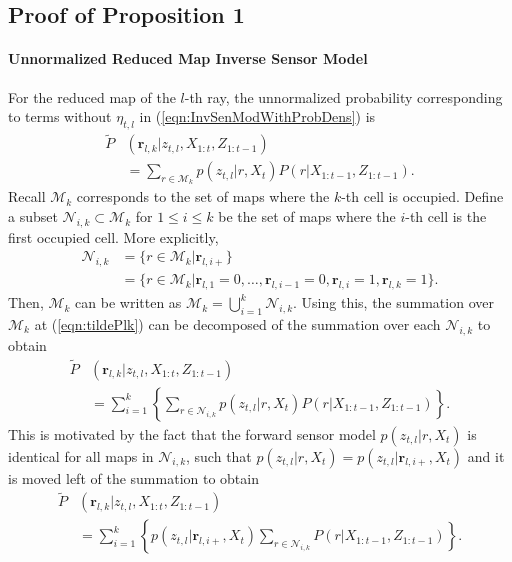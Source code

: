 \documentclass[letterpaper, 10pt, conference]{ieeeconf}
\newcommand{\braces}[1]{\ensuremath{\left\{ #1 \right\}}}
\newcommand{\refeqn}[1]{(\ref{eqn:#1})}
\begin{document}
\begin{appendix}
\label{append}


\subsection{Proof of Proposition 1}

\paragraph{Unnormalized Reduced Map Inverse Sensor Model}
For the reduced map of the $l$-th ray, the unnormalized probability corresponding to terms without $\eta_{t,l}$ in \refeqn{InvSenModWithProbDens} is %
\begin{align}
\tilde P&(\mathbf{r}_{l,k}|z_{t,l},X_{1:t},Z_{1:t-1})\nonumber\\
& = \sum_{r\in\mathcal{M}_{k}} p(z_{t,l}|r,X_t) P(r|X_{1:t-1},Z_{1:t-1}).\label{eqn:tildePlk}
\end{align}
Recall $\mathcal{M}_k$ corresponds to the set of maps where the $k$-th cell is occupied. Define a subset $\mathcal{N}_{i,k}\subset \mathcal{M}_k$ for $1\leq i\leq k$ be the set of maps where the $i$-th cell is the first occupied cell. More explicitly, 
\begin{align*}
\mathcal{N}_{i,k} & = \{ r\in\mathcal{M}_k| \mathbf{r}_{l,i+}\}\\
&= \{ r\in\mathcal{M}_k| \mathbf{r}_{l,1}=0,\ldots, \mathbf{r}_{l,i-1}=0, \mathbf{r}_{l,i}=1,
\mathbf{r}_{l,k}=1\}.
\end{align*}
Then, $\mathcal{M}_k$ can be written as $\mathcal{M}_k =\bigcup_{i=1}^{k} \mathcal{N}_{i,k}$. Using this, the summation over $\mathcal{M}_k$ at \refeqn{tildePlk} can be decomposed of the summation over each $\mathcal{N}_{i,k}$ to obtain
\begin{align*}
\tilde P&(\mathbf{r}_{l,k}|z_{t,l},X_{1:t},Z_{1:t-1})\nonumber\\
& = \sum_{i=1}^k\braces{\sum_{r\in\mathcal{N}_{i,k}} p(z_{t,l}|r,X_t) P(r|X_{1:t-1},Z_{1:t-1})}.
\end{align*}
This is motivated by the fact that the forward sensor model $p(z_{t,l}|r,X_t)$ is identical for all maps in $\mathcal{N}_{i,k}$, such that $p(z_{t,l}|r,X_t)=p(z_{t,l}|\mathbf{r}_{l,i+},X_t)$ and it is moved left of the summation to obtain
\begin{align}
\tilde P&(\mathbf{r}_{l,k}|z_{t,l},X_{1:t},Z_{1:t-1})\nonumber\\
& = \sum_{i=1}^k \braces{p(z_{t,l}|\mathbf{r}_{l,i+},X_t) \sum_{r\in\mathcal{N}_{i,k}} P(r|X_{1:t-1},Z_{1:t-1})}.\label{eqn:tildePlk0}

\end{align}
\end{appendix}
\end{document}
